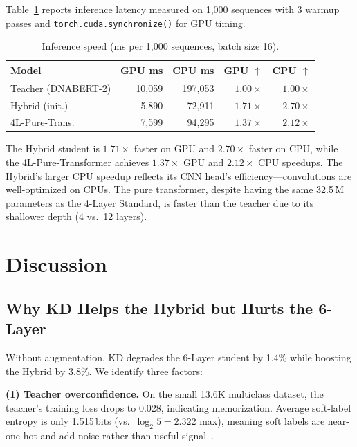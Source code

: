 \documentclass[conference]{IEEEtran}
\begin{document}
Table~\ref{tab:speed} reports inference latency measured on 1,000 sequences with 3 warmup passes and \texttt{torch.cuda.synchronize()} for GPU timing.

\begin{table}[t]
\centering
\caption{Inference speed (ms per 1,000 sequences, batch size 16).}
\label{tab:speed}
\setlength{\tabcolsep}{3.5pt}
\begin{tabular}{lrrrr}
\toprule
\textbf{Model} & \textbf{GPU ms} & \textbf{CPU ms} & \textbf{GPU $\uparrow$} & \textbf{CPU $\uparrow$} \\
\midrule
Teacher (DNABERT-2)  & 10,059 & 197,053 & $1.00\times$ & $1.00\times$ \\
Hybrid (init.)   & 5,890  & 72,911  & $1.71\times$ & $\mathbf{2.70\times}$ \\
4L-Pure-Trans.   & 7,599  & 94,295  & $1.37\times$ & $2.12\times$ \\
\bottomrule
\end{tabular}
\end{table}

The Hybrid student is $1.71\times$ faster on GPU and $2.70\times$ faster on CPU, while the 4L-Pure-Transformer achieves $1.37\times$ GPU and $2.12\times$ CPU speedups. The Hybrid's larger CPU speedup reflects its CNN head's efficiency---convolutions are well-optimized on CPUs. The pure transformer, despite having the same 32.5\,M parameters as the 4-Layer Standard, is faster than the teacher due to its shallower depth (4 vs.\ 12 layers).

\section{Discussion}
\label{sec:discussion}

\subsection{Why KD Helps the Hybrid but Hurts the 6-Layer}

Without augmentation, KD degrades the 6-Layer student by 1.4\% while boosting the Hybrid by 3.8\%. We identify three factors:

\textbf{(1) Teacher overconfidence.}\quad
On the small 13.6K multiclass dataset, the teacher's training loss drops to 0.028, indicating memorization. Average soft-label entropy is only 1.515\,bits (vs.\ $\log_2 5 = 2.322$ max), meaning soft labels are near-one-hot and add noise rather than useful signal~\cite{hinton2015distilling, li2023curriculum}.
\end{document}
